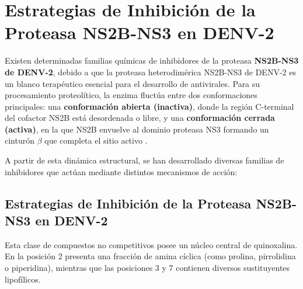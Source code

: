 \section{Estrategias de Inhibición de la Proteasa NS2B-NS3 en DENV-2}
Existen determinadas familias químicas de inhibidores de la proteasa \textbf{NS2B-NS3 de DENV-2}, debido a que la proteasa heterodimérica NS2B-NS3 de DENV-2 es un blanco terapéutico esencial para el desarrollo de antivirales. Para su procesamiento proteolítico, la enzima fluctúa entre dos conformaciones principales: una \textbf{conformación abierta (inactiva)}, donde la región C-terminal del cofactor NS2B está desordenada o libre, y una \textbf{conformación cerrada (activa)}, en la que NS2B envuelve al dominio proteasa NS3 formando un cinturón $\beta$ que completa el sitio activo \cite{chandramouli2010serotype, maus2021sar}.

A partir de esta dinámica estructural, se han desarrollado diversas familias de inhibidores que actúan mediante distintos mecanismos de acción:

\vspace{0.5em}

\subsection{Estrategias de Inhibición de la Proteasa NS2B-NS3 en DENV-2}
Esta clase de compuestos no competitivos posee un núcleo central de quinoxalina. En la posición 2 presenta una fracción de amina cíclica (como prolina, pirrolidina o piperidina), mientras que las posiciones 3 y 7 contienen diversos sustituyentes lipofílicos.

